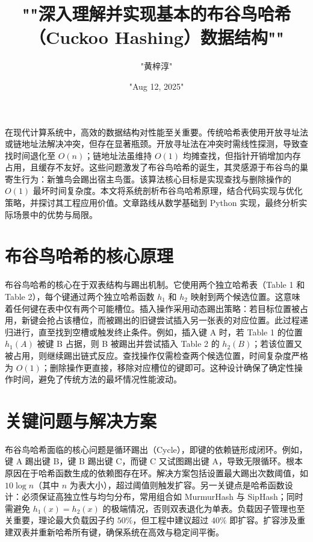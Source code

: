 \title{""深入理解并实现基本的布谷鸟哈希（Cuckoo Hashing）数据结构""}
\author{"黄梓淳"}
\date{"Aug 12, 2025"}
\maketitle
在现代计算系统中，高效的数据结构对性能至关重要。传统哈希表使用开放寻址法或链地址法解决冲突，但存在显著瓶颈。开放寻址法在冲突时需线性探测，导致查找时间退化至 $O(n)$；链地址法虽维持 $O(1)$ 均摊查找，但指针开销增加内存占用，且缓存不友好。这些问题激发了布谷鸟哈希的诞生，其灵感源于布谷鸟的巢寄生行为：新雏鸟会踢出宿主鸟蛋。该算法核心目标是实现查找与删除操作的 $O(1)$ 最坏时间复杂度。本文将系统剖析布谷鸟哈希原理，结合代码实现与优化策略，并探讨其工程应用价值。文章路线从数学基础到 Python 实现，最终分析实际场景中的优势与局限。\par
\chapter{布谷鸟哈希的核心原理}
布谷鸟哈希的核心在于双表结构与踢出机制。它使用两个独立哈希表（Table 1 和 Table 2），每个键通过两个独立哈希函数 $h_1$ 和 $h_2$ 映射到两个候选位置。这意味着任何键在表中仅有两个可能槽位。插入操作采用动态踢出策略：若目标位置被占用，新键会抢占该槽位，而被踢出的旧键尝试插入另一张表的对应位置。此过程递归进行，直至找到空槽或触发终止条件。例如，插入键 A 时，若 Table 1 的位置 $h_1(A)$ 被键 B 占据，则 B 被踢出并尝试插入 Table 2 的 $h_2(B)$；若该位置又被占用，则继续踢出链式反应。查找操作仅需检查两个候选位置，时间复杂度严格为 $O(1)$；删除操作更直接，移除对应槽位的键即可。这种设计确保了确定性操作时间，避免了传统方法的最坏情况性能波动。\par
\chapter{关键问题与解决方案}
布谷鸟哈希面临的核心问题是循环踢出（Cycle），即键的依赖链形成闭环。例如，键 A 踢出键 B，键 B 踢出键 C，而键 C 又试图踢出键 A，导致无限循环。根本原因在于哈希函数生成的依赖图存在环。解决方案包括设置最大踢出次数阈值，如 $10\log{n}$（其中 $n$ 为表大小），超过阈值则触发扩容。另一关键点是哈希函数设计：必须保证高独立性与均匀分布，常用组合如 MurmurHash 与 SipHash；同时需避免 $h_1(x) = h_2(x)$ 的极端情况，否则双表退化为单表。负载因子管理也至关重要，理论最大负载因子约 $50\%$，但工程中建议超过 $40\%$ 即扩容。扩容涉及重建双表并重新哈希所有键，确保系统在高效与稳定间平衡。\par
